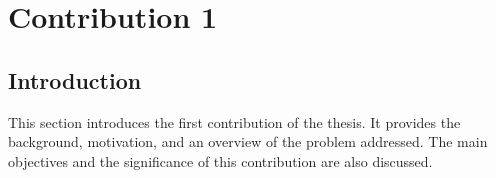 \chapter{Contribution 1}
\label{ch::Contribution1}

\section{Introduction}
This section introduces the first contribution of the thesis. It provides the background, motivation, and an overview of the problem addressed. The main objectives and the significance of this contribution are also discussed.